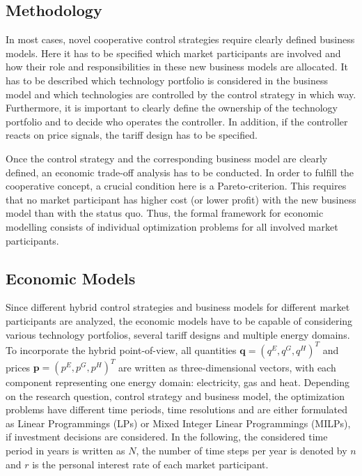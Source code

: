 \documentclass[review]{elsarticle}
\begin{document}
\subsection{Methodology}
\label{sec:econ-2}
In most cases, novel cooperative control strategies require clearly
defined business models. Here it has to be specified which market
participants are involved and how their role and responsibilities in
these new business models are allocated. It has to be described which
technology portfolio is considered in the business model and which
technologies are controlled by the control strategy in which
way. Furthermore, it is important to clearly define the ownership of
the technology portfolio
and to decide who operates the controller. 
In addition,
if the controller reacts on price signals, the tariff design has to be
specified.

Once the control strategy and the corresponding business model are
clearly defined, an economic trade-off analysis 
has to be conducted. In order to fulfill the cooperative
concept, a  crucial condition here is a Pareto-criterion. This
requires that no market participant has higher cost (or lower profit)
with the new business model
than with the status quo. Thus, the formal framework for economic
modelling consists of individual optimization problems for all
involved market participants. 

\subsection{Economic Models}
\label{sec:econ-3}
Since different hybrid control strategies and business models for
different market participants are analyzed, the economic models have
to be capable of considering various technology portfolios, several
tariff designs and multiple energy domains. To incorporate the hybrid
point-of-view, all quantities $\mathbf{q}=(q^E, q^G, q^H )^T$ and prices $\mathbf{p}=(p^E, p^G, p^H )^T$ are written as
three-dimensional vectors,
with each component representing one energy domain: electricity,
gas and heat. Depending on the research question, control strategy and
business model, the optimization problems have different time periods,
time resolutions and are either formulated as Linear Programmings
(LPs) or Mixed Integer Linear Programmings (MILPs), if investment
decisions are considered. In the following, the considered
time period in years is written as $N$, the number of time steps per
year is denoted by $n$ and $r$ is the personal interest rate of each
market participant. 
\end{document}
